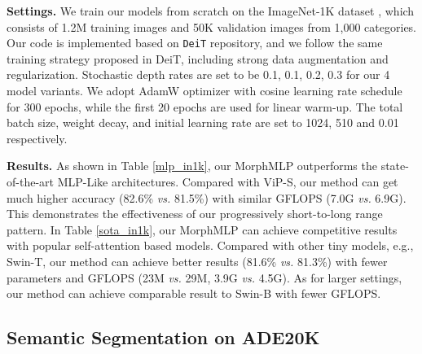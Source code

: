 \documentclass[runningheads]{llncs}
\begin{document}
%
 \noindent
\textbf{Settings.} We train our models from scratch on the ImageNet-1K dataset \cite{imagenet},
which consists of 1.2M training images and 50K validation images from 1,000 categories.
Our code is implemented based on \texttt{DeiT}\cite{deit} repository, and we follow the same training strategy proposed in DeiT\cite{deit},
including strong data augmentation and regularization. 
Stochastic depth rates are set to be 0.1, 0.1, 0.2, 0.3 for our 4 model variants.
We adopt AdamW \cite{adamw} optimizer with cosine learning rate schedule \cite{cosine} for 300 epochs,
while the first 20 epochs are used for linear warm-up\cite{warmup}. 
The total batch size, weight decay, and initial learning rate are set to 1024, 510 and 0.01 respectively.




\noindent
\textbf{Results.} As shown in Table \ref{mlp_in1k}, our MorphMLP outperforms the state-of-the-art MLP-Like architectures. Compared with ViP-S\cite{vip}, our method can get much higher accuracy (82.6\% \textit{vs.}  81.5\%) with similar GFLOPS (7.0G \textit{vs.} 6.9G). This demonstrates the effectiveness of our progressively short-to-long range  pattern. In Table \ref{sota_in1k}, our MorphMLP can achieve competitive results with popular self-attention based models. Compared with other tiny models, e.g., Swin-T\cite{swin}, our method can achieve better results (81.6\% \textit{vs.}  81.3\%) with fewer parameters and GFLOPS (23M \textit{vs.}  29M, 3.9G \textit{vs.}  4.5G). As for larger settings, our method can achieve comparable result to Swin-B \cite{swin} with fewer GFLOPS.



\subsection{Semantic Segmentation on ADE20K}
\end{document}
